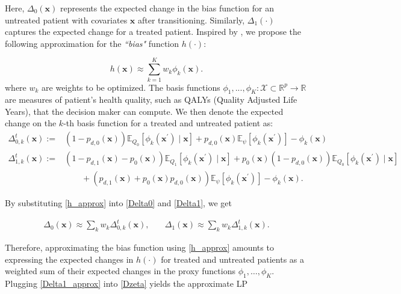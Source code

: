 \documentclass[12pt,a4paper]{article}
\newcommand{\blue}[1]{{\color{blue}{#1}}}
\newcommand{\bx}{\mathbf{x}}
\newcommand{\mX}{\mathcal{X}}
\begin{document}
\noindent Here, $\Delta_0(\bx)$ represents the expected change in the bias function for an untreated patient with covariates $\bx$ after transitioning. Similarly, $\Delta_1(\cdot)$ captures the expected change for a treated patient. Inspired by \cite{price-directed}, we propose the following approximation for the {\it ``bias"} function $h(\cdot)$:
		
\begin{equation} \label{h_approx}
			h(\bx) \approx \sum_{k=1}^K w_k \phi_k(\bx).
\end{equation}
where $w_k$ are weights to be optimized. The basis functions $\phi_1,...,\phi_K:\mX \subset \mathbb{R}^p \rightarrow \mathbb{R}$ are measures of patient's health quality, such as QALYs (Quality Adjusted Life Years), that the decision maker can compute. We then denote the expected change on the $k$-th basis function for a treated and untreated patient as: 
\begin{align*} 
\Delta_{0, k}^t({\bx}):= & \left(1-p_{d,0}({\bx})\right) \mathbb{E}_{Q_{0}}\left[\phi_k\left({\bx}^{\prime}\right) \mid {\bx}\right]+p_{d,0}({\bx}) \mathbb{E}_\psi\left[\phi_k\left({\bx}^{\prime}\right)\right]-\phi_k({\bx}) \\ 
\Delta_{1, k}^t({\bx}):= & \left(1-p_{d,1}({\bx})-p_0({\bx})\right) \mathbb{E}_{Q_{1}}\left[\phi_k\left({\bx}^{\prime}\right) \mid {\bx}\right]+p_0({\bx})(1-p_{d,0}({\bx})) \mathbb{E}_{Q_{0}}\left[\phi_k\left({\bx}^{\prime}\right) \mid {\bx}\right]\\
& \quad \quad + (p_{d,1}({\bx}) + p_0({\bx})p_{d,0}({\bx})) \mathbb{E}_\psi\left[\phi_k\left({\bx}^{\prime}\right)\right]-\phi_k({\bx}).
\end{align*}


\noindent By substituting \eqref{h_approx} into \eqref{Delta0} and \eqref{Delta1}, we get 

\begin{align}
\Delta_0(\bx)\approx \sum_k w_k \Delta_{0, k}^t(\bx), & \quad
\Delta_1(\bx)\approx \sum_k w_k \Delta_{1, k}^t(\bx). \label{Delta1_approx}
\end{align}

\noindent Therefore, approximating the bias function using \eqref{h_approx} amounts to expressing the expected changes in $h(\cdot)$ for treated and untreated patients as a weighted sum of their expected changes in the proxy functions $\phi_1, \ldots, \phi_K$. Plugging \eqref{Delta1_approx} into \eqref{Dzeta} yields the approximate LP
\end{document}
